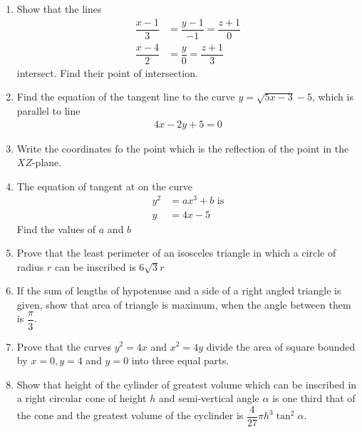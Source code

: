\begin{enumerate}
    \item Show that the lines
          \begin{align*}
              \dfrac{x-1}{3} & = \dfrac{y-1}{-1} = \dfrac{z+1}{0} \\
              \dfrac{x-4}{2} & = \dfrac{y}{0} = \dfrac{z+1}{3}
          \end{align*}
          intersect. Find their point of intersection.
    \item Find the equation of the tangent line to the curve $y=\sqrt{5x-3} -5$, which is parallel to line
          \begin{align*}
              4x-2y+5=0
          \end{align*}
    \item Write the coordinates fo the point which is the reflection of the point \brak{\alpha,\beta,\gamma} in the $XZ$-plane.
    \item The equation of tangent at  on the curve
          \begin{align*}
              y^2 & = ax^3 + b \text { is} \\
              y   & = 4x -5
          \end{align*}
          Find the values of $a$ and $b$
    \item Prove that the least perimeter of an isosceles triangle in which a circle of radius $r$ can be inscribed is $6 \sqrt{3} r$
    \item If the sum of lengths of hypotenuse and a side of a right angled triangle is given, show that area of triangle is maximum, when the angle between them is $\dfrac{\pi}{3}$.
    \item Prove that the curves $y^2=4x$ and $x^2= 4y$ divide the area of square bounded by $x=0,y=4$ and $y=0$ into three equal parts.
    \item Show that height of the cylinder of greatest volume which can be inscribed in a right circular cone of height $h$ and semi-vertical angle $\alpha$ is one third that of the cone and the greatest volume of the cyclinder is $\dfrac{4}{27}\pi h^3\tan^2\alpha$.
\end{enumerate}
